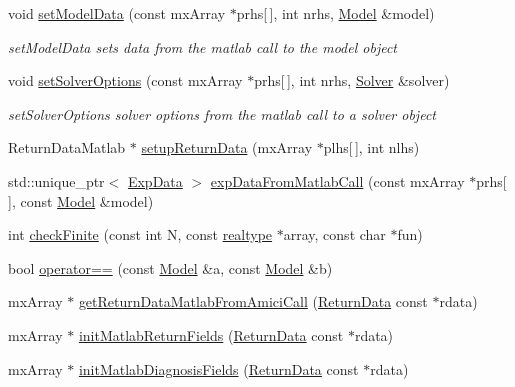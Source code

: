\begin{DoxyCompactItemize}
void \mbox{\hyperlink{namespaceamici_aacdc2fc7895f234ad13713d2bd99870d}{set\+Model\+Data}} (const mx\+Array $\ast$prhs\mbox{[}$\,$\mbox{]}, int nrhs, \mbox{\hyperlink{classamici_1_1_model}{Model}} \&model)
\begin{DoxyCompactList}\small\item\em set\+Model\+Data sets data from the matlab call to the model object \end{DoxyCompactList}\item 
void \mbox{\hyperlink{namespaceamici_aab6be0027d918715e2ba50828088110b}{set\+Solver\+Options}} (const mx\+Array $\ast$prhs\mbox{[}$\,$\mbox{]}, int nrhs, \mbox{\hyperlink{classamici_1_1_solver}{Solver}} \&solver)
\begin{DoxyCompactList}\small\item\em set\+Solver\+Options solver options from the matlab call to a solver object \end{DoxyCompactList}\item 
Return\+Data\+Matlab $\ast$ \mbox{\hyperlink{namespaceamici_a91a3ac85998f7dd60d633882e9504b07}{setup\+Return\+Data}} (mx\+Array $\ast$plhs\mbox{[}$\,$\mbox{]}, int nlhs)
\item 
std\+::unique\+\_\+ptr$<$ \mbox{\hyperlink{classamici_1_1_exp_data}{Exp\+Data}} $>$ \mbox{\hyperlink{namespaceamici_a186dd3debfe185669f305464f161e4bb}{exp\+Data\+From\+Matlab\+Call}} (const mx\+Array $\ast$prhs\mbox{[}$\,$\mbox{]}, const \mbox{\hyperlink{classamici_1_1_model}{Model}} \&model)
\item 
int \mbox{\hyperlink{namespaceamici_aeb0886d5a74ea04eeef52219063aa7d4}{check\+Finite}} (const int N, const \mbox{\hyperlink{namespaceamici_a1bdce28051d6a53868f7ccbf5f2c14a3}{realtype}} $\ast$array, const char $\ast$fun)
\item 
bool \mbox{\hyperlink{namespaceamici_ad5a9ae5abc63d6c24c64506c0f9aed6d}{operator==}} (const \mbox{\hyperlink{classamici_1_1_model}{Model}} \&a, const \mbox{\hyperlink{classamici_1_1_model}{Model}} \&b)
\item 
mx\+Array $\ast$ \mbox{\hyperlink{namespaceamici_a698409f4b9ce06055bcebcee39f81a91}{get\+Return\+Data\+Matlab\+From\+Amici\+Call}} (\mbox{\hyperlink{classamici_1_1_return_data}{Return\+Data}} const $\ast$rdata)
\item 
mx\+Array $\ast$ \mbox{\hyperlink{namespaceamici_a7449834fca1e0bde53d5f73ae0d2b929}{init\+Matlab\+Return\+Fields}} (\mbox{\hyperlink{classamici_1_1_return_data}{Return\+Data}} const $\ast$rdata)
\item 
mx\+Array $\ast$ \mbox{\hyperlink{namespaceamici_aa12d4917fed647a1edeaaa26a261c770}{init\+Matlab\+Diagnosis\+Fields}} (\mbox{\hyperlink{classamici_1_1_return_data}{Return\+Data}} const $\ast$rdata)

\end{DoxyCompactItemize}
